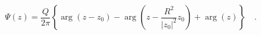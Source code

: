 \begin{equation}
\Psi(z)=\frac{Q}{2\pi}\left\{\arg(z-z_0)-\arg\left(z-\frac{R^2}{|z_0|^2}z_0\right)+\arg(z)\right\}\quad.
\end{equation}

